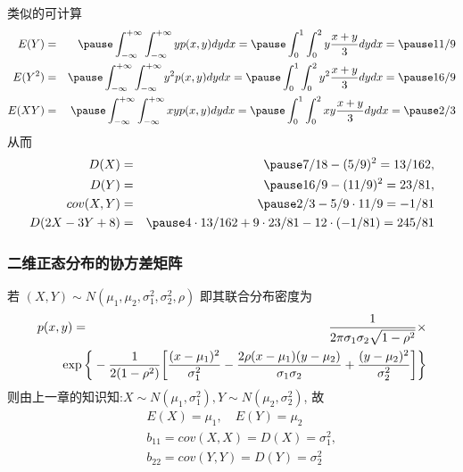 \begin{frame}
	类似的可计算
	\begin{eqnarray*}
		E(Y)&=&\pause \int_{-\infty}^{+\infty}\int_{-\infty}^{+\infty}yp(x,y)dydx=\pause \int_0^1\int_0^2y\dfrac{x+y}{3}dydx=\pause 11/9\\
		E(Y^2)&=&\pause \int_{-\infty}^{+\infty}\int_{-\infty}^{+\infty}y^2p(x,y)dydx=\pause \int_0^1\int_0^2y^2\dfrac{x+y}{3}dydx=\pause 16/9\\
		E(XY)&=&\pause \int_{-\infty}^{+\infty}\int_{-\infty}^{+\infty}xyp(x,y)dydx=\pause \int_0^1\int_0^2xy\dfrac{x+y}{3}dydx=\pause 2/3
	\end{eqnarray*}
	\pause 从而
	\begin{eqnarray*}
		D(X)&=&\pause 7/18-(5/9)^2=13/162, \\
		D(Y)&=&\pause 16/9-(11/9)^2=23/81, \\
		cov(X,Y)&=&\pause 2/3-5/9\cdot 11/9=-1/81\\
		D(2X-3Y+8)&=&\pause 4\cdot 13/162+9\cdot 23/81-12\cdot (-1/81)=245/81
	\end{eqnarray*}

\end{frame}
\begin{frame}
	\frametitle{二维正态分布的协方差矩阵}
	若 $(X,Y)\sim N (\mu_1,\mu_2,\sigma_1^2,\sigma_2^2,\rho)$ 即其联合分布密度为
	\pause  \begin{eqnarray*}
		p(x,y)&=&\dfrac{1}{2\pi \sigma_1\sigma_2\sqrt{1-\rho^2}}\times\\
		&&\hspace{-1cm}\exp\bigg\{-\dfrac{1}{2(1-\rho^2)}\bigg[\dfrac{(x-\mu_1)^2}{\sigma_1^2}-\dfrac{2\rho(x-\mu_1)(y-\mu_2)}{\sigma_1\sigma_2}+\dfrac{(y-\mu_2)^2}{\sigma_2^2}\bigg]\bigg\}
	\end{eqnarray*}
	则由上一章的知识知:\pause  $X\sim N (\mu_1,\sigma_1^2), Y\sim N (\mu_2,\sigma_2^2)$, 故 \pause
	\begin{eqnarray*}
		&& E(X)=\mu_1, \quad E(Y)=\mu_2\\
		&&b_{11}=cov(X,X)=D(X)=\sigma_1^2,\\
		&& b_{22}=cov(Y,Y)=D(Y)=\sigma_2^2
	\end{eqnarray*}

\end{frame}
